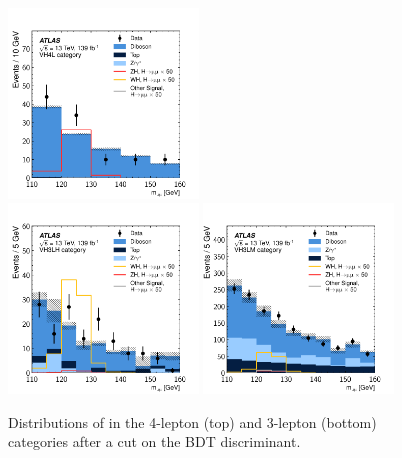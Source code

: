 \begin{figure}[htpb]
  \centering
  \includegraphics[width=0.45\textwidth]{figures/hmm/public/postCut/histo-4lep0-muu.pdf} \\
  \includegraphics[width=0.45\textwidth]{figures/hmm/public/postCut/histo-3lep0-muu.pdf} 
  \includegraphics[width=0.45\textwidth]{figures/hmm/public/postCut/histo-3lep1-muu.pdf} 
  \caption{Distributions of \muu in the 4-lepton (top) and 3-lepton (bottom) categories after a cut on the BDT discriminant.}
    \label{fig:hmmPostcutMassHists}
\end{figure}
\clearpage

